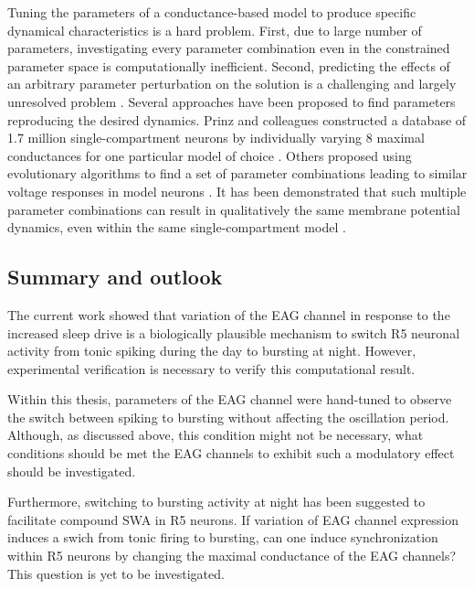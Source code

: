 \documentclass[../main.tex]{subfiles}
\begin{document}
Tuning the parameters of a conductance-based model to produce specific dynamical characteristics is a hard problem. First, due to large number of parameters, investigating every parameter combination even in the constrained parameter space is computationally inefficient. Second, predicting the effects of an arbitrary parameter perturbation on the solution is a challenging and largely unresolved problem \parencite{alonsoVisualizationCurrentsNeural2019}. Several approaches have been proposed to find parameters reproducing the desired dynamics. Prinz and colleagues constructed a database of 1.7 million single-compartment neurons by individually varying $8$ maximal conductances for one particular model of choice \parencite{prinzAlternativeHandTuningConductanceBased2003}. Others proposed using evolutionary algorithms to find a set of parameter combinations leading to similar voltage responses in model neurons \parencite{alonsoVisualizationCurrentsNeural2019}. It has been demonstrated that such multiple parameter combinations can result in qualitatively the same membrane potential dynamics, even within the same single-compartment model \parencite{alonsoVisualizationCurrentsNeural2019}.

\subsection{Summary and outlook}

The current work showed that variation of the EAG channel in response to the increased sleep drive is a biologically plausible mechanism to switch R5 neuronal activity from tonic spiking during the day to bursting at night. However, experimental verification is necessary to verify this computational result.

Within this thesis, parameters of the EAG channel were hand-tuned to observe the switch between spiking to bursting without affecting the oscillation period. Although, as discussed above, this condition might not be necessary, what conditions should be met the EAG channels to exhibit such a modulatory effect should be investigated.

Furthermore, switching to bursting activity at night has been suggested to facilitate compound SWA in R5 neurons. If variation of EAG channel expression induces a swich from tonic firing to bursting,
can one induce synchronization within R5 neurons by changing the maximal conductance of the EAG channels? This question is yet to be investigated. 
\end{document}

